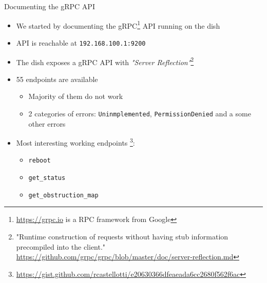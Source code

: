 \documentclass[NET,english,beameralt]{tumbeamer}
\begin{document}
\begin{frame}{Documenting the gRPC API}
    \begin{itemize}
        \item We started by documenting the gRPC\footnote{\url{https://grpc.io} is a RPC framework from Google} API running on the dish
        \item API is reachable at \texttt{192.168.100.1:9200}
        \item The dish exposes a gRPC API with \emph{"Server Reflection"}\footnote{"Runtime construction of requests without having stub
            information precompiled into the client." \url{https://github.com/grpc/grpc/blob/master/doc/server-reflection.md}}
        \item 55 endpoints are available
        \begin{itemize}
            \item Majority of them do not work
            \item 2 categories of errors: \texttt{Uninmplemented}, \texttt{PermissionDenied} and a some other errors 
        \end{itemize}
        \item Most interesting working endpoints \footnote{\url{https://gist.github.com/rcastellotti/e20630366dfeaeada6cc2680f562f6ac}}: 
            \begin{itemize}
                \item \texttt{reboot}
                \item \texttt{get\_status}
                \item \texttt{get\_obstruction\_map}
            \end{itemize}
    \end{itemize}
\end{frame}
\end{document}
